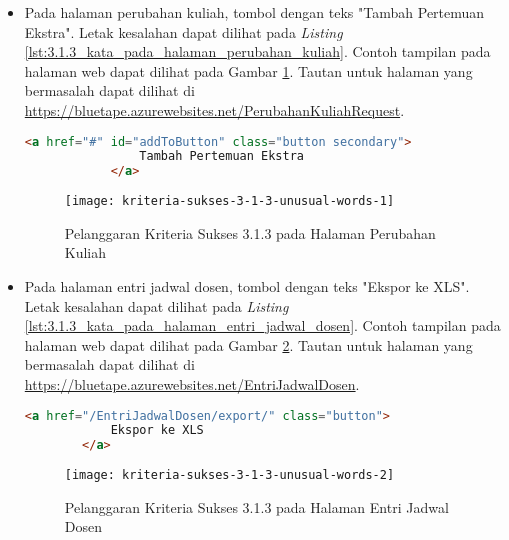 \begin{itemize}
    \item Pada halaman perubahan kuliah, tombol dengan teks "Tambah Pertemuan Ekstra". Letak kesalahan dapat dilihat pada \textit{Listing} \ref{lst:3.1.3_kata_pada_halaman_perubahan_kuliah}. Contoh tampilan pada halaman web dapat dilihat pada Gambar \ref{fig:3.1.3_unusual_words_1}. Tautan untuk halaman yang bermasalah dapat dilihat di \url{https://bluetape.azurewebsites.net/PerubahanKuliahRequest}.
    \begin{lstlisting}[frame=single, label={lst:3.1.3_kata_pada_halaman_perubahan_kuliah}, language=HTML, caption=Pelanggaran Kriteria Sukses 3.1.3 pada Halaman Perubahan Kuliah]
            <a href="#" id="addToButton" class="button secondary">
                Tambah Pertemuan Ekstra
            </a>
    \end{lstlisting}
    
    \begin{figure}[H]
        \centering  
        \texttt{[image: kriteria-sukses-3-1-3-unusual-words-1]}  
        \caption[Pelanggaran Kriteria Sukses 3.1.3 pada Halaman Perubahan Kuliah]{Pelanggaran Kriteria Sukses 3.1.3 pada Halaman Perubahan Kuliah}
        \label{fig:3.1.3_unusual_words_1}  
    \end{figure}
    
    \item Pada halaman entri jadwal dosen, tombol dengan teks "Ekspor ke XLS". Letak kesalahan dapat dilihat pada \textit{Listing} \ref{lst:3.1.3_kata_pada_halaman_entri_jadwal_dosen}. Contoh tampilan pada halaman web dapat dilihat pada Gambar \ref{fig:3.1.3_unusual_words_2}. Tautan untuk halaman yang bermasalah dapat dilihat di \url{https://bluetape.azurewebsites.net/EntriJadwalDosen}.
    \begin{lstlisting}[frame=single, label={lst:3.1.3_kata_pada_halaman_entri_jadwal_dosen}, language=HTML, caption=Pelanggaran Kriteria Sukses 3.1.3 pada Halaman Entri Jadwal Dosen]
        <a href="/EntriJadwalDosen/export/" class="button">
            Ekspor ke XLS
        </a>
    \end{lstlisting}
    
    \begin{figure}[H]
        \centering  
        \texttt{[image: kriteria-sukses-3-1-3-unusual-words-2]}  
        \caption[Pelanggaran Kriteria Sukses 3.1.3 pada Halaman Entri Jadwal Dosen]{Pelanggaran Kriteria Sukses 3.1.3 pada Halaman Entri Jadwal Dosen}
        \label{fig:3.1.3_unusual_words_2}  
    \end{figure}


\end{itemize}

